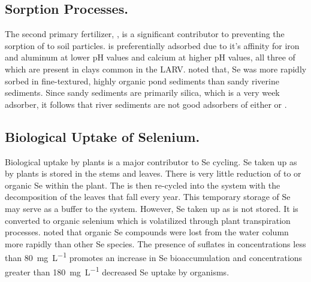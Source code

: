 \begin{linenumbers}[1]
\subsection*{Sorption Processes.}
The second primary fertilizer, \phosphate, is a significant contributor to preventing the sorption of \selenite to soil particles.  \phosphate is preferentially adsorbed due to it's affinity for iron and aluminum at lower pH values and calcium at higher pH values, all three of which are present in clays common in the LARV.  \citet{Besser1989} noted that, Se was more rapidly sorbed in fine-textured, highly organic pond sediments than sandy riverine sediments.  Since sandy sediments are primarily silica, which is a very week adsorber, it follows that river sediments are not good adsorbers of either \phosphate or \selenite \citep{Oram2008}.

\subsection*{Biological Uptake of Selenium.}
Biological uptake by plants is a major contributor to Se cycling.  Se taken up as \selenate by plants is stored in the stems and leaves.  There is very little reduction of \selenate to \selenite or organic Se within the plant.  The \selenate is then re-cycled into the system with the decomposition of the leaves that fall every year.  This temporary storage of Se may serve as a buffer to the system.  However, Se taken up as \selenite is not stored.  It is converted to organic selenium which is volatilized through plant transpiration processes.  \citet{Besser1989} noted that organic Se compounds were lost from the water column more rapidly than other Se species.  The presence of suflates in concentrations less than \SI{80}{\milli\gram\per\liter} promotes an increase in Se bioaccumulation and concentrations greater than \SI{180}{\milli\gram\per\liter} decreased Se uptake by organisms.   


\end{linenumbers}

